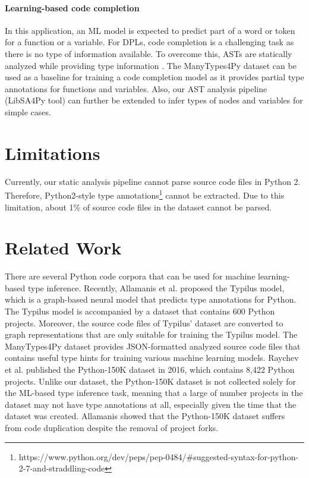 \documentclass[10pt, conference]{IEEEtran}
\begin{document}
\paragraph{\textbf{Learning-based code completion}} In this application, an ML model is expected to predict part of a word or token for a function or a variable. For DPLs, code completion is a challenging task as there is no type of information available. To overcome this, ASTs are statically analyzed while providing type information \cite{svyatkovskiy2019pythia}. The ManyTypes4Py dataset can be used as a baseline for training a code completion model as it provides partial type annotations for functions and variables. Also, our AST analysis pipeline (LibSA4Py tool) can further be extended to infer types of nodes and variables for simple cases.

\section{Limitations}
Currently, our static analysis pipeline cannot parse source code files in Python 2. Therefore, Python2-style type annotations\footnote{https://www.python.org/dev/peps/pep-0484/\#suggested-syntax-for-python-2-7-and-straddling-code} cannot be extracted. Due to this limitation, about 1\% of source code files in the dataset cannot be parsed.

\section{Related Work}
There are several Python code corpora that can be used for machine learning-based type inference. Recently, Allamanis et al. \cite{allamanis2020typilus} proposed the Typilus model, which is a graph-based neural model that predicts type annotations for Python. The Typilus model \cite{allamanis2020typilus} is accompanied by a dataset that contains 600 Python projects. Moreover, the source code files of Typilus' dataset are converted to graph representations that are only suitable for training the Typilus model. The ManyTypes4Py dataset provides JSON-formatted analyzed source code files that contains useful type hints for training various machine learning models. Raychev et al. \cite{raychev2016probabilistic} published the Python-150K dataset in 2016, which contains 8,422 Python projects. Unlike our dataset, the Python-150K dataset \cite{raychev2016probabilistic} is not collected solely for the ML-based type inference task, meaning that a large of number projects in the dataset may not have type annotations at all, especially given the time that the dataset was created. Allamanis \cite{allamanis2019adverse} showed that the Python-150K dataset suffers from code duplication despite the removal of project forks.
\end{document}
